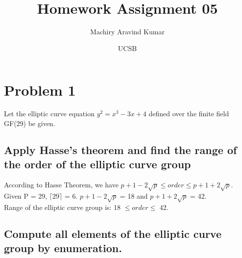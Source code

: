 \documentclass[11pt, pdftex]{article}
\title{Homework Assignment 05}
\author{Machiry Aravind Kumar}
\date{UCSB}
\begin{document}
\maketitle
\section{Problem 1}
Let the elliptic curve equation $y^{2} = x^{3} - 3x + 4$ defined over the finite field GF(29) be given.
\subsection{Apply Hasse’s theorem and find the range of the order of the elliptic curve group}
According to Hasse Theorem, we have $p + 1 - 2 \sqrt{p} \leq order \leq p + 1 + 2 \sqrt{p}$. \\
Given P = 29, $\lceil 29 \rceil$ = 6. $p + 1 - 2 \sqrt{p}$ = 18 and $p + 1 + 2 \sqrt{p}$ = 42. \\
Range of the elliptic curve group is: 18 $\leq order \leq$ 42.
\subsection{Compute all elements of the elliptic curve group by enumeration.}
\end{document}
